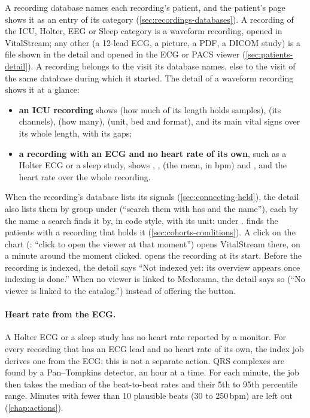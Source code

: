 A recording database names each recording's patient, and the patient's page shows it as an
entry of its category (\cref{sec:recordings-databases}). A recording of the ICU, Holter, EEG or
Sleep category is a waveform recording, opened in VitalStream; any other (a 12-lead ECG, a
picture, a PDF, a DICOM study) is a file shown in the detail and opened in the ECG or PACS
viewer (\cref{sec:patients-detail}). A recording belongs to the visit its database names, else
to the visit of the same database during which it started. The detail of a waveform recording
shows it at a glance:
\begin{itemize}
\item \textbf{an ICU recording} shows  (how much of its length holds samples),
   (its channels),  (how many),  (unit, bed and
  format), and its main vital signs over its whole length, with its gaps;
\item \textbf{a recording with an ECG and no heart rate of its own}, such as a Holter ECG or a
  sleep study, shows , ,  (the mean, in bpm) and
  , and the heart rate over the whole recording.
\end{itemize}
When the recording's database lists its signals (\cref{sec:connecting-held}), the detail also
lists them by group under  (``search them with has and the name''), each by the name
a search finds it by, in code style, with its unit:  under .
 finds the patients with a recording that holds it
(\cref{sec:cohorts-conditions}).
A click on the chart (: ``click to open the viewer at that moment'') opens
VitalStream there, on a minute around the moment clicked.  opens the
recording at its start. Before the recording is indexed, the detail says ``Not indexed yet: its
overview appears once indexing is done.'' When no viewer is linked to Medorama, the detail says
so (``No viewer is linked to the catalog.'') instead of offering the button.

\paragraph{Heart rate from the ECG.} A Holter ECG or a sleep study has no heart rate reported by
a monitor. For every recording that has an ECG lead and no heart rate of its own, the index job
derives one from the ECG; this is not a separate action. QRS complexes are found by a
Pan--Tompkins detector, an hour at a time. For each minute, the job then takes the median of the
beat-to-beat rates and their 5th to 95th percentile range. Minutes with fewer than 10 plausible
beats (30 to 250\,bpm) are left out (\cref{chap:actions}).

